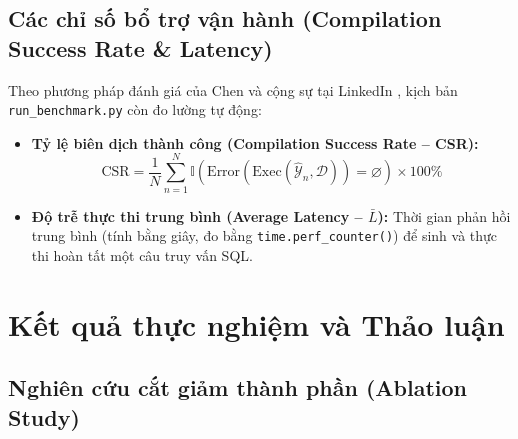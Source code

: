 \documentclass[12pt,a4paper]{report}
\begin{document}
\subsection{Các chỉ số bổ trợ vận hành (Compilation Success Rate \& Latency)}
Theo phương pháp đánh giá của Chen và cộng sự tại LinkedIn \cite{chen2025enterprise}, kịch bản \texttt{run\_benchmark.py} còn đo lường tự động:
\begin{itemize}
    \item \textbf{Tỷ lệ biên dịch thành công (Compilation Success Rate -- CSR):}
    \begin{equation}
        \text{CSR} = \frac{1}{N} \sum_{n=1}^{N} \mathbb{I}\left( \text{Error}\left(\text{Exec}\left(\hat{\mathcal{Y}}_n, \mathcal{D}\right)\right) = \varnothing \right) \times 100\%
        \label{eq:metric_csr}
    \end{equation}
    \item \textbf{Độ trễ thực thi trung bình (Average Latency -- $\bar{L}$):} Thời gian phản hồi trung bình (tính bằng giây, đo bằng \texttt{time.perf\_counter()}) để sinh và thực thi hoàn tất một câu truy vấn SQL.
\end{itemize}

\section{Kết quả thực nghiệm và Thảo luận}

\subsection{Nghiên cứu cắt giảm thành phần (Ablation Study)}
\end{document}
